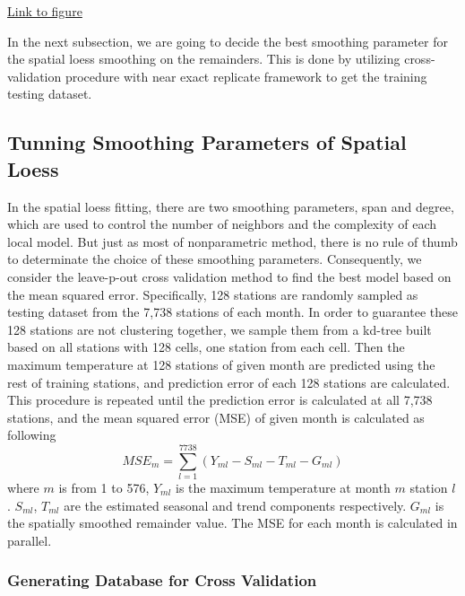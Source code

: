 \begin{framed}
\begin{center}
  \href{../plots/a1950/spafit/d2/span0.015/a1950.spaResid.vs.elev.lon.pdf}
  {Link to figure}
  \label{spafit.elev.lon}
\end{center}
\end{framed}

In the next subsection, we are going to decide the best smoothing parameter for
the spatial loess smoothing on the remainders. This is done by utilizing cross-
validation procedure with near exact replicate framework to get the training 
testing dataset.

\subsection{Tunning Smoothing Parameters of Spatial Loess}

In the spatial loess fitting, there are two smoothing parameters, span and degree,
which are used to control the number of neighbors and the complexity of each 
local model. But just as most of nonparametric method, there is no rule of thumb
to determinate the choice of these smoothing parameters. Consequently, we consider
the leave-p-out cross validation method to find the best model based on the mean 
squared error. Specifically, 128 stations are randomly sampled as testing dataset
from the 7,738 stations of each month. In order to guarantee these 128 stations
are not clustering together, we sample them from a kd-tree built based on all
stations with 128 cells, one station from each cell. Then the maximum temperature
at 128 stations of given month are predicted using the rest of training stations,
and prediction error of each 128 stations are calculated. This procedure is 
repeated until the prediction error is calculated at all 7,738 stations, and the
mean squared error (MSE) of given month is calculated as following
\begin{equation} 
MSE_m = \sum_{l=1}^{7738} \left( Y_{ml} - S_{ml} - T_{ml} - G_{ml}
\right) 
\end{equation} 
where $m$ is from 1 to 576, $Y_{ml}$ is the maximum temperature at month $m$ 
station $l$. $S_{ml}$, $T_{ml}$ are the estimated seasonal and trend
components respectively. $G_{ml}$ is the spatially smoothed remainder value.
The MSE for each month is calculated in parallel.

\subsubsection{Generating Database for Cross Validation}

